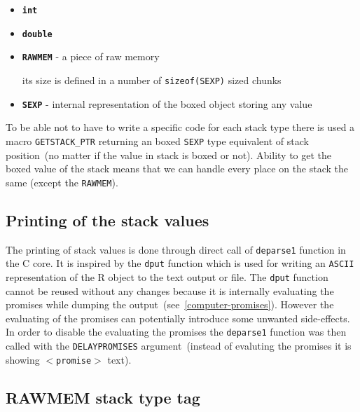 \documentclass[thesis=M,english]{FITthesis}[2018/10/20]
\newcommand{\code}[1]{\texttt{#1}}
\begin{document}
\begin{itemize}
	\item \textbf{\code{int}}
	\item \textbf{\code{double}}
	\item \textbf{\code{RAWMEM}} - a piece of raw memory

		its size is defined in a number of \code{sizeof(SEXP)} sized chunks
	\item \textbf{\code{SEXP}} - internal representation of the boxed object storing any value
\end{itemize}

To be able not to have to write a specific code for each stack type there is used a macro \code{GETSTACK{\_}PTR} returning an boxed \code{SEXP} type equivalent of stack position~(no matter if the value in stack is boxed or not). Ability to get the boxed value of the stack means that we can handle every place on the stack the same (except the \code{RAWMEM}).

\subsection{Printing of the stack values}\label{printing-stack-values}

The printing of stack values is done through direct call of \code{deparse1} function in the C core. It is inspired by the \code{dput} function which is used for writing an \code{ASCII} representation of the R object to the text output or file. The \code{dput} function cannot be reused without any changes because it is internally evaluating the promises while dumping the output~(see~\ref{computer-promises}). However the evaluating of the promises can potentially introduce some unwanted side-effects. In order to disable the evaluating the promises the \code{deparse1} function was then called with the \code{DELAYPROMISES} argument~(instead of evaluting the promises it is showing \code{$<$promise$>$} text).

\subsection{RAWMEM stack type tag}
\end{document}
